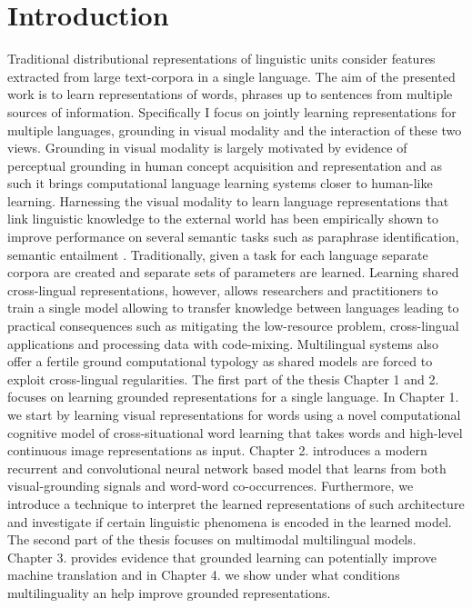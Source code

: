 

\chapter{Introduction}
\label{introduction}

Traditional distributional representations of linguistic units consider features extracted from large text-corpora in a single language.
The aim of the presented work is to learn representations of words, phrases up to sentences from multiple sources of information. Specifically I focus on jointly learning
representations for multiple languages, grounding in visual modality and the interaction of these two views.
Grounding in visual modality is largely motivated by evidence of perceptual grounding in human concept acquisition and representation \cite{barsalou2003grounding}
and as such it brings computational language learning systems closer to human-like learning. Harnessing the visual modality to learn language representations that link linguistic knowledge
to the external world \cite{kiela2014improving,baroni2016grounding,elliott2017imagination,kiela2017learning,yoo2017improving}  has been empirically shown to
improve performance on several semantic tasks such as paraphrase identification, semantic entailment \cite{dolan2004unsupervised,marelli2014sick}.
Traditionally, given a task for each language separate corpora are created and separate sets of parameters are learned.
Learning shared cross-lingual representations, however, allows researchers and practitioners
to train a single model allowing to transfer knowledge between languages leading to practical consequences such as mitigating the low-resource problem, cross-lingual
applications and processing data with code-mixing. Multilingual systems also offer a fertile ground computational typology as shared models are forced to exploit cross-lingual
regularities.
The first part of the thesis Chapter 1 and 2. focuses on learning grounded representations for a single language.
In Chapter 1. we start by learning visual representations for words  using a novel computational cognitive model of cross-situational word learning that takes words
and high-level continuous image representations as input. Chapter 2. introduces a modern recurrent and convolutional neural network based model that learns from both
visual-grounding signals and word-word co-occurrences. Furthermore, we introduce a technique to interpret the learned representations of such architecture and investigate
if certain linguistic phenomena is encoded in the learned model. The second part of the thesis focuses on multimodal multilingual models. Chapter 3. provides evidence
that grounded learning can potentially improve machine translation and  in Chapter 4. we show under what conditions multilinguality an help improve grounded representations.

